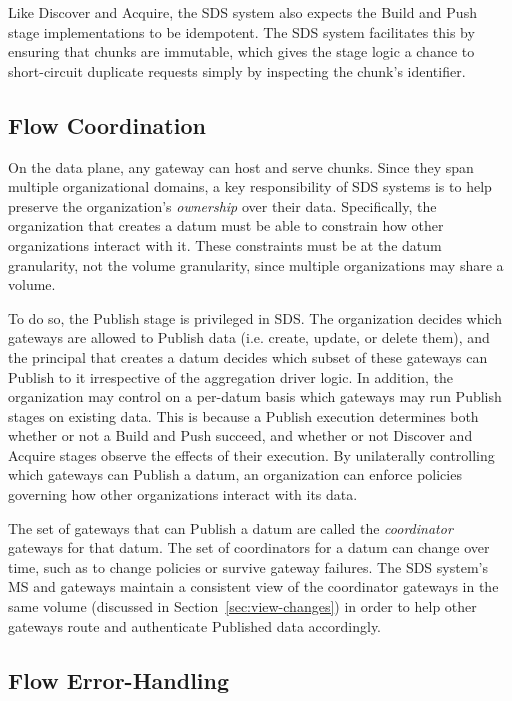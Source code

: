 Like Discover and Acquire, the SDS system also expects the Build and Push stage
implementations to be idempotent.  The SDS system facilitates this by ensuring
that chunks are immutable, which gives the stage logic a chance to short-circuit
duplicate requests simply by inspecting the chunk's identifier.

\subsection{Flow Coordination}

On the data plane, any gateway can host and serve chunks.
Since they span multiple organizational domains, a key responsibility of SDS systems
is to help preserve the organization's \emph{ownership} over their data.
Specifically, the organization that creates a datum
must be able to constrain how other organizations interact with it.  These
constraints must be at the datum granularity, not the volume granularity, since
multiple organizations may share a volume.

To do so, the Publish stage is privileged in SDS.  The organization decides
which gateways are allowed to Publish data (i.e. create, update, or delete
them), and the principal that creates a
datum decides which subset of these gateways can Publish to it irrespective of
the aggregation driver logic.  In addition, the organization may control on a
per-datum basis which gateways may run Publish stages on existing data.
This is because a Publish
execution determines both whether or not a Build and Push succeed, and
whether or not Discover and Acquire stages observe the effects of their
execution.  By unilaterally controlling which gateways can Publish a datum,
an organization can enforce policies governing how other
organizations interact with its data.

The set of gateways that can Publish a datum are called the \emph{coordinator}
gateways for that datum.
The set of coordinators for a datum can change over time, such as to change
policies or survive gateway failures.  The SDS system's MS and gateways
maintain a consistent view of the coordinator gateways in the same volume
(discussed in Section~\ref{sec:view-changes}) in order to help other gateways
route and authenticate Published data accordingly.

\subsection{Flow Error-Handling}

